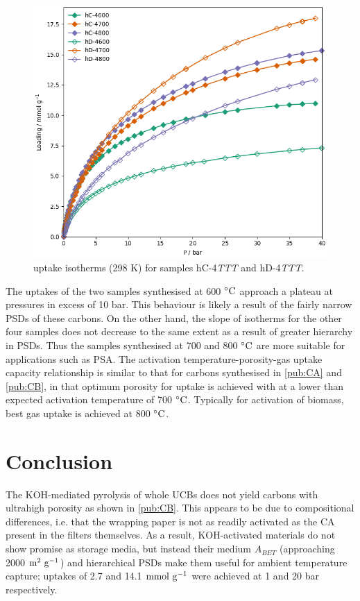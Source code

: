 \begin{figure}[t]
    \centering
    \includegraphics[width=\columnwidth, keepaspectratio]{4-cbs/figs/CB_CO2.png}
    \caption{ uptake isotherms (298 K) for samples hC-4\textit{TTT} and hD-4\textit{TTT}.}
    \label{fig:cb_co2}
\end{figure}

The  uptakes of the two samples synthesised at 600 $\rm ^{\circ}C$ approach a plateau at pressures in excess of 10 bar. This behaviour is likely a result of the fairly narrow PSDs of these carbons. On the other hand, the slope of isotherms for the other four samples does not decrease to the same extent as a result of greater hierarchy in PSDs. Thus the samples synthesised at 700 and 800 $\rm ^{\circ}C$ are more suitable for applications such as PSA.\citep{Sevilla2014Energy} The activation temperature-porosity-gas uptake capacity relationship is similar to that for carbons synthesised in \ref{pub:CA} and \ref{pub:CB}, in that optimum porosity for  uptake is achieved with at a lower than expected activation temperature of 700 $\rm ^{\circ}C$. Typically for activation of biomass, best gas uptake is achieved at 800 $\rm ^{\circ}C$.\citep{Ariharan2018}

\section{Conclusion}

The KOH-mediated pyrolysis of whole UCBs does not yield carbons with ultrahigh porosity as shown in \ref{pub:CB}. This appears to be due to compositional differences, i.e. that the wrapping paper is not as readily activated as the CA present in the filters themselves. As a result, KOH-activated materials do not show promise as  storage media, but instead their medium $A_{BET}$ (approaching 2000 $\rm m^2\ g^{-1}$) and hierarchical PSDs make them useful for ambient temperature  capture;  uptakes of 2.7 and 14.1 $\rm mmol\ g^{-1}$ were achieved at 1 and 20 bar respectively. 

